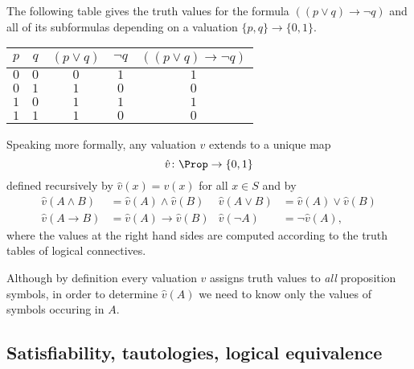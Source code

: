\begin{page}

\begin{exl}
\label{exl:TruthTable}
The following table gives the truth values for the formula $((p \vee q) \to \neg q)$ and all of its subformulas
depending on a valuation $\{p, q\} \to \{0,1\}$.
\begin{center}
\begin{tabular}{|c|c|c|c|c|}
\hline
$p$ & $q$ & $(p \vee q)$ & $\neg q$ & $((p \vee q) \to \neg q)$\\\hline
$0$ & $0$ & $0$ & $1$ & $1$\\\hline
$0$ & $1$ & $1$ & $0$ & $0$\\\hline
$1$ & $0$ & $1$ & $1$ & $1$\\\hline
$1$ & $1$ & $1$ & $0$ & $0$\\\hline
\end{tabular}
\end{center}
\end{exl}

\end{page}

\begin{page}


Speaking more formally, any valuation $v$ extends to a unique map
\[
\hat{v} \colon \Prop \to \{0,1\}
\]
defined recursively by $\hat{v}(x) = v(x)$ for all $x \in S$ and by
\begin{align*}
\hat{v}(A \wedge B) &= \hat{v}(A) \wedge \hat{v}(B) & \hat{v}(A \vee B) &= \hat{v}(A) \vee \hat{v}(B)\\
\hat{v}(A \to B) &= \hat{v}(A) \to \hat{v}(B) & \hat{v}(\neg A) &= \neg \hat{v}(A),
\end{align*}
where the values at the right hand sides are computed according to the truth tables of logical connectives.

Although by definition every valuation $v$ assigns truth values to \emph{all} proposition symbols,
in order to determine $\hat{v}(A)$ we need to know only the values of symbols occuring in $A$.



\end{page}

\begin{page}

\subsection{Satisfiability, tautologies, logical equivalence}

\end{page}


